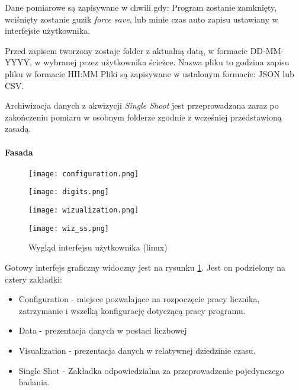 Dane pomiarowe są zapisywane w chwili gdy: Program zostanie zamknięty, wciśnięty zostanie guzik \textit{force save}, lub minie czas auto zapisu ustawiany w interfejsie użytkownika. 

Przed zapisem tworzony zostaje folder z aktualną datą, w formacie DD-MM-YYYY, w wybranej przez użytkownika ścieżce. Nazwa pliku to godzina zapisu pliku w formacie HH:MM
Pliki są zapisywane w ustalonym formacie: JSON lub CSV.

Archiwizacja danych z akwizycji \textit{Single Shoot} jest przeprowadzana zaraz po zakończeniu pomiaru w osobnym folderze zgodnie z wcześniej przedstawioną zasadą. 

\paragraph{Fasada}
\begin{figure}
        \begin{multicols}{2}
        
        \texttt{[image: configuration.png]}\par
        
        
        \texttt{[image: digits.png]}\par
        
        
        \end{multicols}\hfill
        
        \begin{multicols}{2}
        
        
        \texttt{[image: wizualization.png]}\par
        
        
        \texttt{[image: wiz\_ss.png]}\par
        
        \end{multicols}
        \caption{Wygląd interfejsu użytkownika (linux)}
        \label{Gui pic}
        \end{figure}

Gotowy interfejs graficzny widoczny jest na rysunku \ref{Gui pic}. Jest on podzielony na cztery zakładki:
\begin{itemize}
        \item Configuration - miejsce pozwalające na rozpoczęcie pracy licznika, zatrzymanie i wszelką konfigurację dotyczącą pracy programu. 
        \item Data - prezentacja danych w postaci liczbowej 
        \item Visualization - prezentacja danych w relatywnej dziedzinie czasu. 
        \item Single Shot - Zakładka odpowiedzialna za przeprowadzenie pojedynczego badania.
\end{itemize}

